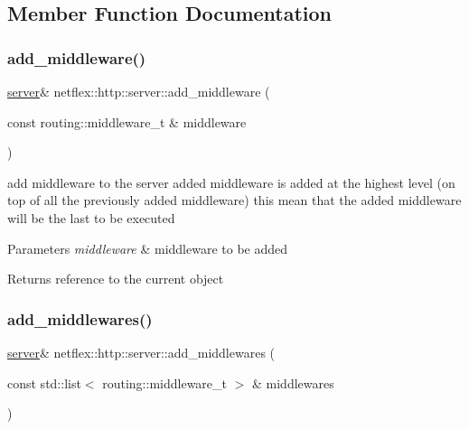 \subsection{Member Function Documentation}
\mbox{\label{classnetflex_1_1http_1_1server_a636cba8b31debed0d880db5905736450}} 
\subsubsection{\texorpdfstring{add\+\_\+middleware()}{add\_middleware()}}
{\footnotesize\ttfamily \hyperlink{classnetflex_1_1http_1_1server}{server}\& netflex\+::http\+::server\+::add\+\_\+middleware (\begin{DoxyParamCaption}\item[{const routing\+::middleware\+\_\+t \&}]{middleware }\end{DoxyParamCaption})}

add middleware to the server added middleware is added at the highest level (on top of all the previously added middleware) this mean that the added middleware will be the last to be executed


\begin{DoxyParams}{Parameters}
{\em middleware} & middleware to be added \\
\hline
\end{DoxyParams}
\begin{DoxyReturn}{Returns}
reference to the current object 
\end{DoxyReturn}
\mbox{\label{classnetflex_1_1http_1_1server_a266ef122b1fd38062a5b45ef58f15b2a}} 
\subsubsection{\texorpdfstring{add\+\_\+middlewares()}{add\_middlewares()}}
{\footnotesize\ttfamily \hyperlink{classnetflex_1_1http_1_1server}{server}\& netflex\+::http\+::server\+::add\+\_\+middlewares (\begin{DoxyParamCaption}\item[{const std\+::list$<$ routing\+::middleware\+\_\+t $>$ \&}]{middlewares }\end{DoxyParamCaption})}

